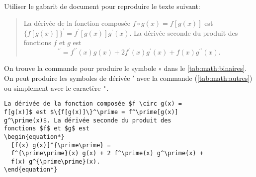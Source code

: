 \begin{exercice}
  Utiliser le gabarit de document  pour
  reproduire le texte suivant:
  \begin{quote}
    La dérivée de la fonction composée $f \circ g(x) = f[g(x)]$ est
    $\{f[g(x)]\}^\prime = f^\prime[g(x)] g^\prime(x)$. La dérivée
    seconde du produit des fonctions $f$ et $g$ est
    \begin{equation*}
      [f(x) g(x)]^{\prime\prime} =
      f^{\prime\prime}(x) g(x) + 2 f^\prime(x) g^\prime(x) +
      f(x) g^{\prime\prime}(x).
    \end{equation*}
  \end{quote}
  \begin{sol}
    On trouve la commande pour produire le symbole $\circ$ dans le
    \autoref{tab:math:binaires}. On peut produire les symboles de
    dérivée $\prime$ avec la commande \cmd{\prime}
    (\autoref{tab:math:autres}) ou simplement avec le caractère
    \verb='=.
\begin{lstlisting}
La dérivée de la fonction composée $f \circ g(x) =
f[g(x)]$ est $\{f[g(x)]\}^\prime = f^\prime[g(x)]
g^\prime(x)$. La dérivée seconde du produit des
fonctions $f$ et $g$ est
\begin{equation*}
  [f(x) g(x)]^{\prime\prime} =
  f^{\prime\prime}(x) g(x) + 2 f^\prime(x) g^\prime(x) +
  f(x) g^{\prime\prime}(x).
\end{equation*}
\end{lstlisting}
  \end{sol}
\end{exercice}

